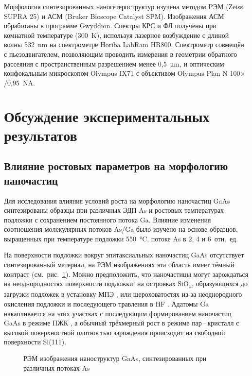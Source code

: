 Морфология синтезированных наногетероструктур изучена методом PЭМ (Zeiss SUPRA
25) и АСМ (Bruker Bioscope Catalyst SPM). Изображения АСМ обработаны в
программе Gwyddion. Спектры КРС и ФЛ получены при комнатной температуре
(300~\si{\kelvin}), используя лазерное возбуждение с длиной волны
532~\si{\nano\metre} на спектрометре Horiba LabRam HR800. Спектрометр совмещён
с пьезодвигателем, позволяющим проводить измерения в геометрии обратного
рассеяния с пространственным разрешением менее 0,5~\si{\micro\metre}, и
оптическим конфокальным микроскопом Olympus IX71 с объективом Olympus Plan N
100\(\times\)/0,95~NA.

\section{Обсуждение экспериментальных результатов}\label{sec:ch5/sec2}

\subsection{Влияние ростовых параметров на морфологию
наночастиц}\label{subsec:ch5/sec2/sub1}

Для исследования влияния условий роста на морфологию наночастиц GaAs
синтезированы образцы при различных ЭДП As и ростовых температурах подложки с
сохранением постоянного потока Ga. Влияние изменения соотношения молекулярных
потоков As/Ga было изучено на основе образцов, выращенных при температуре
подложки 550~\si{\degreeCelsius}, потоке As в 2, 4 и 6~отн.~ед.

На поверхности подложки вокруг эпитаксиальных наночастиц GaAs отсутствует
синтезированный материал, на РЭМ изображениях эта область имеет тёмный контраст
(см.~рис.~\cref{fig:Image_31}). Можно предположить, что наночастицы могут
зарождаться на неоднородностях поверхности подложки: на островках
SiO\textsubscript{x}, образующихся до загрузки подложек в установку МПЭ
\cite{Miura1996, Ogawa1996}, или шероховатостях из-за неоднородного окисления
подложки и последующего травления в HF \cite{Neuwald1992, Jakob1991}. Адатомы
Ga накапливается на этих участках с последующим формированием наночастиц GaAs в
режиме ПЖК \cite{Dubrovskii2012a}, а обычный трёхмерный рост в режиме
пар\,--\,кристалл с высокой поверхностной плотностью зарождения происходит на
свободной поверхности Si(111).

\begin{figure}[ht]   \caption{РЭМ изображения наноструктур GaAs,
				синтезированных при различных потоках As}\label{fig:Image_31}
			\end{figure}

